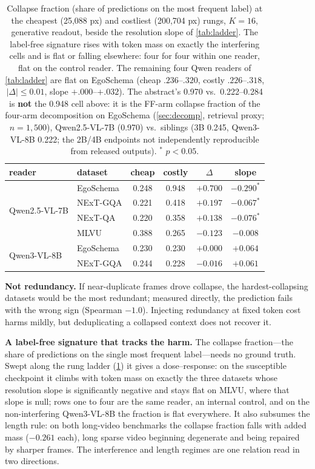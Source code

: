 \documentclass[10pt,twocolumn,letterpaper]{article}
\begin{document}
\begin{table}[t]
\centering
\footnotesize
\setlength{\tabcolsep}{2.4pt}
\begin{tabular}{llcccc}
\toprule
reader & dataset & cheap & costly & $\Delta$ & slope\\
\midrule
\multirow{4}{*}{Qwen2.5-VL-7B}
 & EgoSchema & 0.248 & 0.948 & $+0.700$ & $-0.290^{*}$\\
 & NExT-GQA & 0.221 & 0.418 & $+0.197$ & $-0.067^{*}$\\
 & NExT-QA & 0.220 & 0.358 & $+0.138$ & $-0.076^{*}$\\
 & MLVU & 0.388 & 0.265 & $-0.123$ & $-0.008$\\
\midrule
\multirow{2}{*}{Qwen3-VL-8B}
 & EgoSchema & 0.230 & 0.230 & $+0.000$ & $+0.064$\\
 & NExT-GQA & 0.244 & 0.228 & $-0.016$ & $+0.061$\\
\bottomrule
\end{tabular}
\caption{Collapse fraction (share of predictions on the most frequent label) at the cheapest (25,088 px) and costliest (200,704 px) rungs, $K{=}16$, generative readout, beside the resolution slope of \cref{tab:ladder}. The label-free signature rises with token mass on exactly the interfering cells and is flat or falling elsewhere: four for four within one reader, flat on the control reader. The remaining four Qwen readers of \cref{tab:ladder} are flat on EgoSchema (cheap $.236$--$.320$, costly $.226$--$.318$, $|\Delta|{\le}0.01$, slope $+.000$--$+.032$). The abstract's 0.970 vs.\ 0.222--0.284 is \textbf{not} the 0.948 cell above: it is the FF-arm collapse fraction of the four-arm decomposition on EgoSchema (\cref{sec:decomp}, retrieval proxy; $n{=}1{,}500$), Qwen2.5-VL-7B (0.970) vs.\ siblings (3B 0.245, Qwen3-VL-8B 0.222; the 2B/4B endpoints not independently reproducible from released outputs). $^{*}$ $p{<}0.05$.}
\label{tab:collapse}
\end{table}

\noindent\textbf{Not redundancy.} If near-duplicate frames drove collapse, the hardest-collapsing datasets would be the most redundant; measured directly, the prediction fails with the wrong sign (Spearman $-1.0$). Injecting redundancy at fixed token cost harms mildly, but deduplicating a collapsed context does not recover it.

\noindent\textbf{A label-free signature that tracks the harm.} The collapse fraction---the share of predictions on the single most frequent label---needs no ground truth. Swept along the rung ladder (\cref{tab:collapse}) it gives a dose--response: on the susceptible checkpoint it climbs with token mass on exactly the three datasets whose resolution slope is significantly negative and stays flat on MLVU, where that slope is null; rows one to four are the same reader, an internal control, and on the non-interfering Qwen3-VL-8B the fraction is flat everywhere. It also subsumes the length rule: on both long-video benchmarks the collapse fraction falls with added mass ($-0.261$ each), long sparse video beginning degenerate and being repaired by sharper frames. The interference and length regimes are one relation read in two directions.
\end{document}
